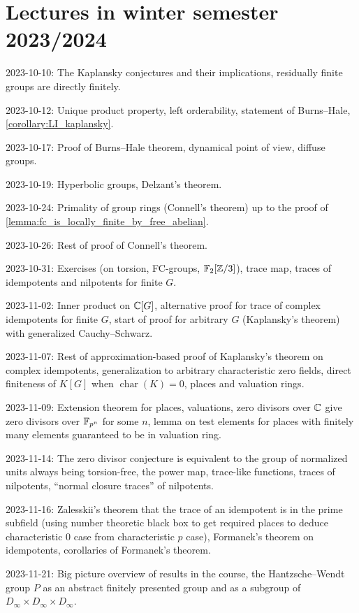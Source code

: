 \chapter{Lectures in winter semester 2023/2024}

2023-10-10: The Kaplansky conjectures and their implications, residually finite groups are directly finitely.

2023-10-12: Unique product property, left orderability, statement of Burns--Hale, \cref{corollary:LI_kaplansky}.

2023-10-17: Proof of Burns--Hale theorem, dynamical point of view, diffuse groups.

2023-10-19: Hyperbolic groups, Delzant's theorem.

2023-10-24: Primality of group rings (Connell's theorem) up to the proof of \cref{lemma:fc_is_locally_finite_by_free_abelian}.

2023-10-26: Rest of proof of Connell's theorem.

2023-10-31: Exercises (on torsion, FC-groups, $\mathbb{F}_2[\mathbb{Z}/3]$), trace map, traces of idempotents and nilpotents for finite $G$.

2023-11-02: Inner product on $\mathbb{C}[G]$, alternative proof for trace of complex idempotents for finite $G$, start of proof for arbitrary $G$ (Kaplansky's theorem) with generalized Cauchy--Schwarz.

2023-11-07: Rest of approximation-based proof of Kaplansky's theorem on complex idempotents, generalization to arbitrary characteristic zero fields, direct finiteness of $K[G]$ when $\operatorname{char}(K) = 0$, places and valuation rings.

2023-11-09: Extension theorem for places, valuations, zero divisors over $\mathbb{C}$ give zero divisors over $\mathbb{F}_{p^n}$ for some $n$, lemma on test elements for places with finitely many elements guaranteed to be in valuation ring.

2023-11-14: The zero divisor conjecture is equivalent to the group of normalized units always being torsion-free, the power map, trace-like functions, traces of nilpotents, ``normal closure traces'' of nilpotents.

2023-11-16: Zalesskii's theorem that the trace of an idempotent is in the prime subfield (using number theoretic black box to get required places to deduce characteristic $0$ case from characteristic $p$ case), Formanek's theorem on idempotents, corollaries of Formanek's theorem.

2023-11-21: Big picture overview of results in the course, the Hantzsche--Wendt group $P$ as an abstract finitely presented group and as a subgroup of $D_\infty \times D_\infty \times D_\infty$.


